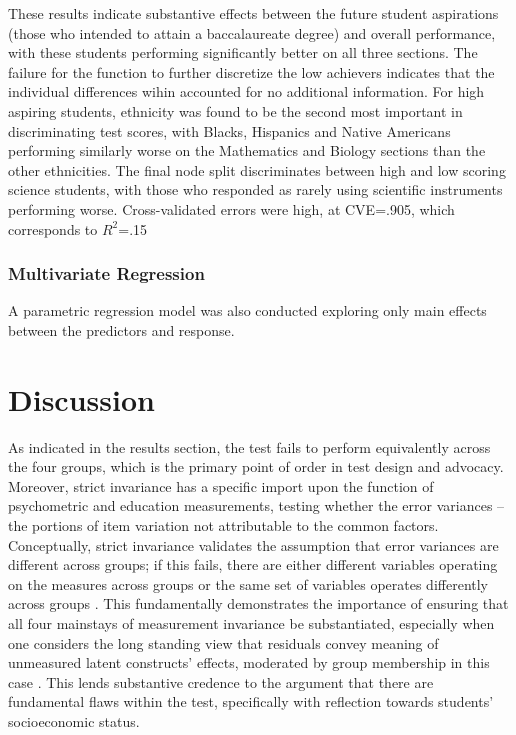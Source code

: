 \documentclass{article}\usepackage[]{graphicx}\usepackage[]{color}
\begin{document}
These results indicate substantive effects between the future student aspirations (those who intended to attain a baccalaureate degree) and overall performance, with these students performing significantly better on all three sections. The failure for the function to further discretize the low achievers indicates that the individual differences wihin accounted for no additional information. For high aspiring students, ethnicity was found to be the second most important in discriminating test scores, with Blacks, Hispanics and Native Americans performing similarly worse on the Mathematics and Biology sections than the other ethnicities. The final node split discriminates between high and low scoring science students, with those who responded as rarely using scientific instruments performing worse. Cross-validated errors were high, at CVE=.905, which corresponds to $R^2$=.15
\subsubsection{Multivariate Regression}
A parametric regression model was also conducted exploring only main effects between the predictors and response.


\section{Discussion}
As indicated in the results section, the test fails to perform equivalently across the four groups, which is the primary point of order in test design and advocacy. Moreover, strict invariance has a specific import upon the function of psychometric and education measurements, testing whether the error variances --the portions of item variation not attributable to the common factors. Conceptually, strict invariance validates the assumption that error variances are different across groups; if this fails, there are either different variables operating on the measures across groups or the same set of variables operates differently across groups \cite{deshon}. This fundamentally demonstrates the importance of ensuring that all four mainstays of measurement invariance be substantiated, especially when one considers the long standing view that residuals convey meaning of unmeasured latent constructs' effects, moderated by group membership in this case \cite{cronbach}. This lends substantive credence to the argument that there are fundamental flaws within the test, specifically with reflection towards students' socioeconomic status.



{}

\end{document}
